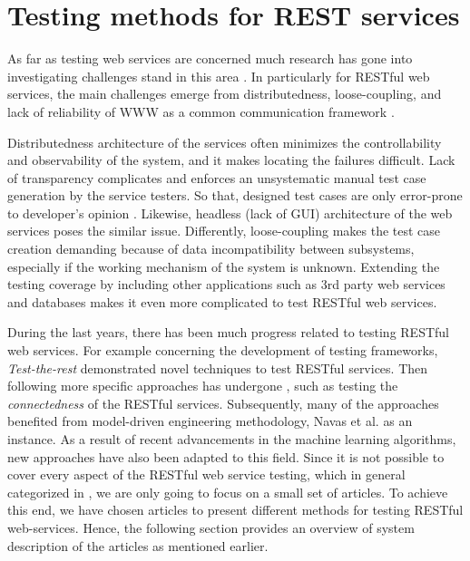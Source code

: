 \documentclass[english]{tktltiki}
\begin{document}
\section{Testing methods for REST services}
As far as testing web services are concerned much research has gone into investigating challenges stand in this area \cite{canfora2009service, bozkurt2013testing}. In particularly for RESTful web services, the main challenges emerge from distributedness, loose-coupling, and lack of reliability of WWW as a common communication framework \cite{chakrabarti2009test}. 

Distributedness architecture of the services often minimizes the controllability and observability of the system, and it makes locating the failures difficult. Lack of transparency complicates and enforces an unsystematic manual test case generation by the service testers. So that, designed test cases are only error-prone to developer's opinion \cite{navas2014rest}. Likewise, headless (lack of GUI) architecture of the web services poses the similar issue. Differently, loose-coupling makes the test case creation demanding because of data incompatibility between subsystems, especially if the working mechanism of the system is unknown. Extending the testing coverage by including other applications such as 3rd party web services and databases makes it even more complicated to test RESTful web services.

During the last years, there has been much progress related to testing RESTful web services. For example concerning the development of testing frameworks, \textit{Test-the-rest} \cite{chakrabarti2009test} demonstrated novel techniques to test RESTful services. Then following more specific approaches has undergone \cite{chakrabarti2010connectedness}, such as testing the \textit{connectedness} of the RESTful services. Subsequently, many of the approaches benefited from model-driven engineering methodology, Navas et al. \cite{navas2014rest} as an instance. As a result of recent advancements in the machine learning algorithms, new approaches \cite{navas2014rest, arcuri2017restful} have also been adapted to this field. Since it is not possible to cover every aspect of the RESTful web service testing, which in general categorized in \cite{canfora2009service, bozkurt2013testing}, we are only going to focus on a small set of articles. To achieve this end, we have chosen articles to present different methods for testing RESTful web-services. Hence, the following section provides an overview of system description of the articles as mentioned earlier.
\end{document}
